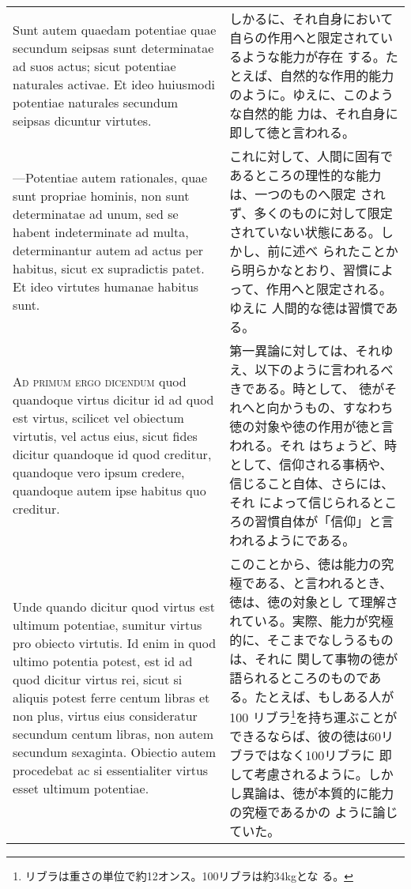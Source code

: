 \documentclass[10pt]{jsarticle}
\begin{document}
\begin{longtable}{p{21em}p{21em}}
\\

Sunt autem quaedam potentiae quae secundum seipsas sunt determinatae
ad suos actus; sicut potentiae naturales activae. Et ideo huiusmodi
potentiae naturales secundum seipsas dicuntur virtutes.

&

しかるに、それ自身において自らの作用へと限定されているような能力が存在
する。たとえば、自然的な作用的能力のように。ゆえに、このような自然的能
力は、それ自身に即して徳と言われる。

\\

---Potentiae autem rationales, quae sunt propriae hominis, non sunt
   determinatae ad unum, sed se habent indeterminate ad multa,
   determinantur autem ad actus per habitus, sicut ex supradictis
   patet. Et ideo virtutes humanae habitus sunt.

&

これに対して、人間に固有であるところの理性的な能力は、一つのものへ限定
されず、多くのものに対して限定されていない状態にある。しかし、前に述べ
られたことから明らかなとおり、習慣によって、作用へと限定される。ゆえに
人間的な徳は習慣である。

\\

{\scshape Ad primum ergo dicendum} quod quandoque virtus dicitur id ad
quod est virtus, scilicet vel obiectum virtutis, vel actus eius, sicut
fides dicitur quandoque id quod creditur, quandoque vero ipsum
credere, quandoque autem ipse habitus quo creditur.

&

第一異論に対しては、それゆえ、以下のように言われるべきである。時として、
徳がそれへと向かうもの、すなわち徳の対象や徳の作用が徳と言われる。それ
はちょうど、時として、信仰される事柄や、信じること自体、さらには、それ
によって信じられるところの習慣自体が「信仰」と言われるようにである。

\\

Unde quando dicitur quod virtus est ultimum potentiae, sumitur virtus
pro obiecto virtutis. Id enim in quod ultimo potentia potest, est id
ad quod dicitur virtus rei, sicut si aliquis potest ferre centum
libras et non plus, virtus eius consideratur secundum centum libras,
non autem secundum sexaginta. Obiectio autem procedebat ac si
essentialiter virtus esset ultimum potentiae.

&

このことから、徳は能力の究極である、と言われるとき、徳は、徳の対象とし
て理解されている。実際、能力が究極的に、そこまでなしうるものは、それに
関して事物の徳が語られるところのものである。たとえば、もしある人が100
リブラ\footnote{リブラは重さの単位で約12オンス。100リブラは約34kgとな
る。}を持ち運ぶことができるならば、彼の徳は60リブラではなく100リブラに
即して考慮されるように。しかし異論は、徳が本質的に能力の究極であるかの
ように論じていた。


\end{longtable}
\end{document}
